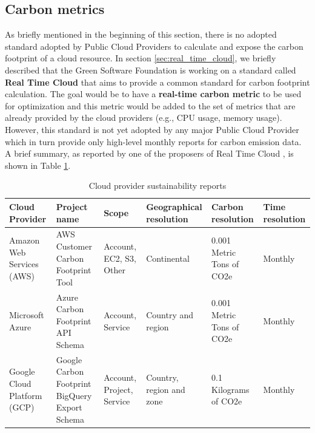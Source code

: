 
\subsection{Carbon metrics}
\label{sec:carbon_metrics}

As briefly mentioned in the beginning of this section, there is no adopted standard adopted by Public Cloud Providers to calculate and expose the carbon footprint of a cloud resource.
In section \ref{sec:real_time_cloud}, we briefly described that the Green Software Foundation is working on a standard called \textbf{Real Time Cloud} that aims to provide a common standard for carbon footprint calculation.
The goal would be to have a \textbf{real-time carbon metric} to be used for optimization and this metric would be added to the set of metrics that are already provided by the cloud providers (e.g., CPU usage, memory usage).
However, this standard is not yet adopted by any major Public Cloud Provider which in turn provide only high-level monthly reports for carbon emission data.
A brief summary, as reported by one of the proposers of Real Time Cloud \cite{cloud_provider_sustainability_reports}, is shown in Table \ref{tab:cloud_carbon_emissions_reports}.

\begin{table}[H]
  \centering
  \renewcommand{\arraystretch}{1.2} %
  \setlength{\extrarowheight}{2pt} %
  \begin{tabularx}{\textwidth}{|X|X|X|X|X|X|}
  \hline
  \textbf{Cloud Provider}     & \textbf{Project name}                          & \textbf{Scope}            & \textbf{Geographical resolution} & \textbf{Carbon resolution} & \textbf{Time resolution} \\ \hline
  Amazon Web Services (AWS)   & AWS Customer Carbon Footprint Tool             & Account, EC2, S3, Other   & Continental                      & 0.001 Metric Tons of CO2e  & Monthly                  \\ \hline
  Microsoft Azure             & Azure Carbon Footprint API Schema              & Account, Service          & Country and region               & 0.001 Metric Tons of CO2e  & Monthly                  \\ \hline
  Google Cloud Platform (GCP) & Google Carbon Footprint BigQuery Export Schema & Account, Project, Service & Country, region and zone         & 0.1 Kilograms of CO2e      & Monthly                  \\ \hline
  \end{tabularx}
  \caption{Cloud provider sustainability reports}
  \label{tab:cloud_carbon_emissions_reports}
\end{table}

